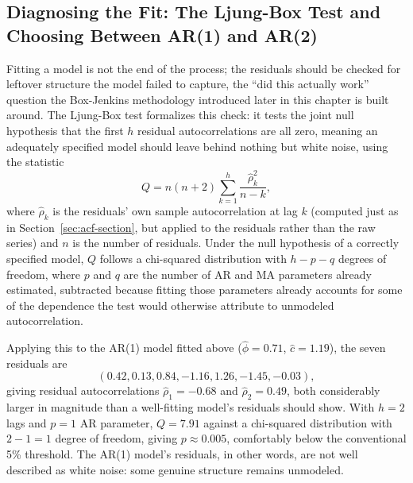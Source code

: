 \documentclass[../ai_in_finance]{subfiles}
\begin{document}
\subsection{Diagnosing the Fit: The Ljung-Box Test and Choosing Between AR(1) and AR(2)}
\label{sec:ljung-box}

Fitting a model is not the end of the process; the residuals should be checked for leftover structure the model failed to capture, the ``did this actually work'' question the Box-Jenkins methodology introduced later in this chapter is built around. The Ljung-Box test formalizes this check: it tests the joint null hypothesis that the first $h$ residual autocorrelations are all zero, meaning an adequately specified model should leave behind nothing but white noise, using the statistic
\begin{equation*}
Q = n(n+2)\sum_{k=1}^h \frac{\hat\rho_k^2}{n-k},
\end{equation*}
where $\hat\rho_k$ is the residuals' own sample autocorrelation at lag $k$ (computed just as in Section~\ref{sec:acf-section}, but applied to the residuals rather than the raw series) and $n$ is the number of residuals. Under the null hypothesis of a correctly specified model, $Q$ follows a chi-squared distribution with $h-p-q$ degrees of freedom, where $p$ and $q$ are the number of AR and MA parameters already estimated, subtracted because fitting those parameters already accounts for some of the dependence the test would otherwise attribute to unmodeled autocorrelation.

Applying this to the AR(1) model fitted above ($\hat\phi=0.71$, $\hat c=1.19$), the seven residuals are 
$$(0.42, 0.13, 0.84,-1.16, 1.26, -1.45, -0.03),$$ 
giving residual autocorrelations $\hat\rho_1 = -0.68$ and $\hat\rho_2 = 0.49$, both considerably larger in magnitude than a well-fitting model's residuals should show. With $h=2$ lags and $p=1$ AR parameter, $Q = 7.91$ against a chi-squared distribution with $2-1=1$ degree of freedom, giving $p \approx 0.005$, comfortably below the conventional 5\% threshold.
The AR(1) model's residuals, in other words, are not well described as white noise: some genuine structure remains unmodeled.
\end{document}
